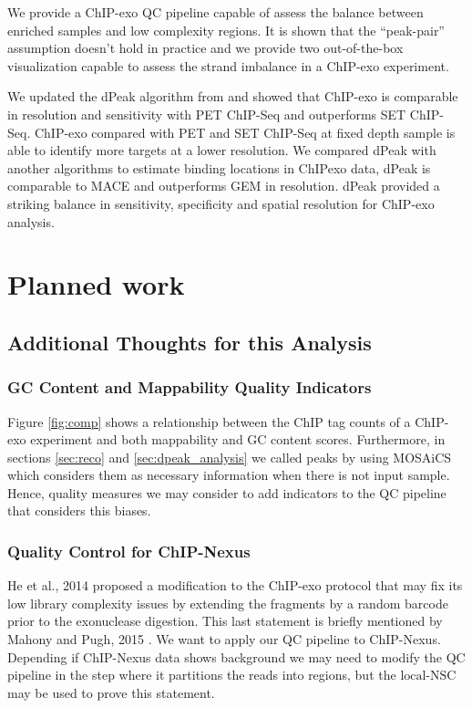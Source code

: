 \documentclass[11pt]{article}\usepackage[]{graphicx}\usepackage[]{color}
\begin{document}
We provide a ChIP-exo QC pipeline capable of assess the balance between
enriched samples and low complexity regions. It is shown that the
``peak-pair'' assumption doesn't hold in practice and we provide two
out-of-the-box visualization capable to assess the strand imbalance in
a ChIP-exo experiment.

We updated the dPeak algorithm from \cite{dpeak} and showed that
ChIP-exo is comparable in resolution and sensitivity with PET ChIP-Seq
and outperforms SET ChIP-Seq. ChIP-exo compared with PET and SET
ChIP-Seq at fixed depth sample is able to identify more targets at a
lower resolution. We compared dPeak with another algorithms to
estimate binding locations in ChIPexo data, dPeak is comparable to
MACE and outperforms GEM in resolution. dPeak provided a striking
balance in sensitivity, specificity and spatial resolution for
ChIP-exo analysis.


\newpage


\section{Planned work}
\label{sec:future}

\subsection{Additional Thoughts for this Analysis}

\subsubsection{GC Content and Mappability Quality Indicators}
\label{sec:gc_map_qc}

Figure \ref{fig:comp} shows a relationship between the ChIP tag counts
of a ChIP-exo experiment and both mappability and GC content
scores. Furthermore, in sections \ref{sec:reco} and
\ref{sec:dpeak_analysis} we called peaks by using MOSAiCS which
considers them as necessary information when there is not input
sample. Hence, quality measures we may consider to add indicators to
the QC pipeline that considers this biases.

\subsubsection{Quality Control for ChIP-Nexus}
\label{sec:nexus}

He et al., 2014 \cite{chipnexus} proposed a modification to the
ChIP-exo protocol that may fix its low library complexity issues by
extending the fragments by a random barcode prior to the exonuclease
digestion. This last statement is briefly mentioned by Mahony and
Pugh, 2015 \cite{exo_review}. We want to apply our QC pipeline to
ChIP-Nexus. Depending if ChIP-Nexus data shows background we may need
to modify the QC pipeline in the step where it partitions the reads
into regions, but the $\mbox{local-NSC}$ may be used to prove this
statement.
\end{document}
